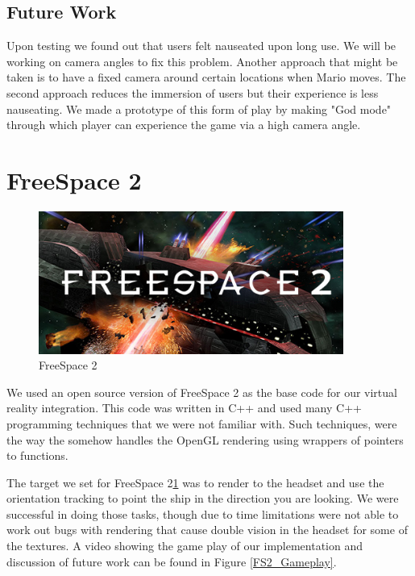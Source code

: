 \documentclass[journal]{IEEEtran}
\begin{document}
\subsection{Future Work}

Upon testing we found out that users felt nauseated upon long use. We will be working on camera angles to fix this problem. Another approach that might be taken is to have a fixed camera around certain locations when Mario moves. The second approach reduces the immersion of users but their experience is less nauseating. We made a prototype of this form of play by making "God mode" through which player can experience the game via a high camera angle.




\section{FreeSpace 2}


\begin{figure}[h]
	\includegraphics[width=10cm]{FreeSpaceHeader} 
	\centering
	\caption{FreeSpace 2\cite{freespace_header}}\label{freespace_header}
\end{figure}

We used an open source version of FreeSpace 2 as the base code\cite{free_space_2_original_source} for our virtual reality integration. This code was written in C++ and used many C++ programming techniques that we were not familiar with. Such techniques, were the way the somehow handles the OpenGL rendering using wrappers of pointers to functions.

The target we set for FreeSpace 2\ref{freespace_header} was to render to the headset and use the orientation tracking to point the ship in the direction you are looking. We were successful in doing those tasks, though due to time limitations were not able to work out bugs with rendering that cause double vision in the headset for some of the textures. A video showing the game play of our implementation and discussion of future work can be found in Figure \ref{FS2_Gameplay}.
\end{document}
